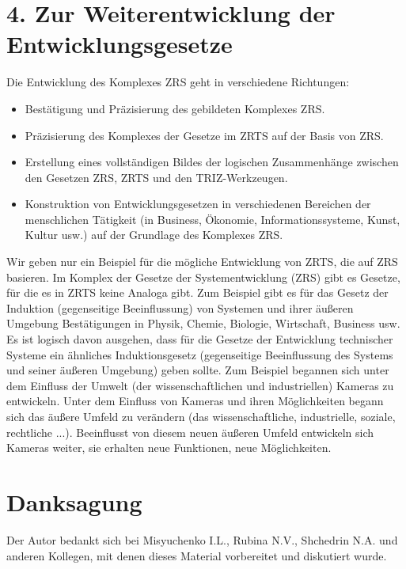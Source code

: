 \documentclass[11pt,a4paper]{article}
\begin{document}
\section*{4. Zur Weiterentwicklung der Entwicklungsgesetze}
Die Entwicklung des Komplexes ZRS geht in verschiedene Richtungen:
\begin{itemize}
  \item Bestätigung und Präzisierung des gebildeten Komplexes ZRS.
  \item Präzisierung des Komplexes der Gesetze im ZRTS auf der Basis von ZRS. 
  \item Erstellung eines vollständigen Bildes der logischen Zusammenhänge
    zwischen den Gesetzen ZRS, ZRTS und den TRIZ-Werkzeugen.
  \item Konstruktion von Entwicklungsgesetzen in verschiedenen Bereichen der
    menschlichen Tätigkeit (in Business, Ökonomie, Informationssysteme, Kunst,
    Kultur usw.) auf der Grundlage des Komplexes ZRS.
\end{itemize}
Wir geben nur ein Beispiel für die mögliche Entwicklung von ZRTS, die auf ZRS
basieren. Im Komplex der Gesetze der Systementwicklung (ZRS) gibt es Gesetze,
für die es in ZRTS keine Analoga gibt.  Zum Beispiel gibt es für das Gesetz
der Induktion (gegenseitige Beeinflussung) von Systemen und ihrer äußeren
Umgebung Bestätigungen in Physik, Chemie, Biologie, Wirtschaft, Business usw.
Es ist logisch davon ausgehen, dass für die Gesetze der Entwicklung
technischer Systeme ein ähnliches Induktionsgesetz (gegenseitige Beeinflussung
des Systems und seiner äußeren Umgebung) geben sollte. Zum Beispiel begannen
sich unter dem Einfluss der Umwelt (der wissenschaftlichen und industriellen)
Kameras zu entwickeln.  Unter dem Einfluss von Kameras und ihren Möglichkeiten
begann sich das äußere Umfeld zu verändern (das wissenschaftliche,
industrielle, soziale, rechtliche ...). Beeinflusst von diesem neuen äußeren
Umfeld entwickeln sich Kameras weiter, sie erhalten neue Funktionen, neue
Möglichkeiten.

\section*{Danksagung}
Der Autor bedankt sich bei Misyuchenko I.L., Rubina N.V., Shchedrin N.A. und
anderen Kollegen, mit denen dieses Material vorbereitet und diskutiert wurde.
\end{document}
